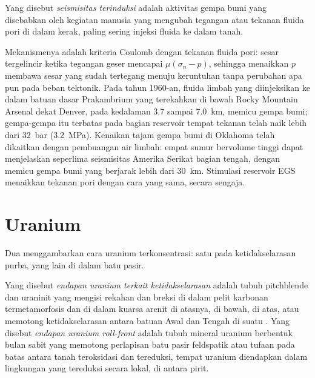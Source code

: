 \begin{definition}\label{def:b2:energy-geology:induced}
Yang disebut \emph{seismisitas terinduksi} adalah aktivitas gempa bumi yang disebabkan oleh kegiatan
manusia yang mengubah tegangan atau tekanan fluida pori di dalam kerak, paling sering
injeksi fluida ke dalam tanah.
\end{definition}

Mekanismenya adalah kriteria Coulomb dengan tekanan fluida pori: sesar tergelincir ketika tegangan geser
mencapai $\mu(\sigma_n - p)$, sehingga menaikkan $p$ membawa sesar yang sudah tertegang menuju keruntuhan
tanpa perubahan apa pun pada beban tektonik. Pada tahun 1960-an, fluida limbah yang diinjeksikan ke dalam batuan dasar
Prakambrium yang terekahkan di bawah Rocky Mountain Arsenal dekat Denver, pada kedalaman 3.7 sampai
\qty{7.0}{km}, memicu gempa bumi; gempa-gempa itu terbatas pada bagian reservoir tempat
tekanan telah naik lebih dari \qty{32}{bar} (\qty{3.2}{MPa}). Kenaikan tajam gempa bumi
di Oklahoma telah dikaitkan dengan pembuangan air limbah: empat sumur bervolume
tinggi dapat menjelaskan seperlima seismisitas Amerika Serikat bagian tengah, dengan memicu
gempa bumi yang berjarak lebih dari \qty{30}{km}. Stimulasi reservoir EGS menaikkan tekanan pori dengan
cara yang sama, secara sengaja.

\section{Uranium}\label{sec:b2:energy-geology:uranium}

Dua  menggambarkan cara uranium terkonsentrasi: satu pada ketidakselarasan purba,
yang lain di dalam batu pasir.

\begin{definition}\label{def:b2:energy-geology:uranium}
Yang disebut \emph{endapan uranium terkait ketidakselarasan} adalah tubuh
pitchblende dan uraninit yang mengisi rekahan dan breksi di dalam pelit karbonan termetamorfosis dan
di dalam kuarsa arenit di atasnya, di bawah, di atas, atau memotong ketidakselarasan antara batuan 
Awal dan Tengah di suatu . Yang disebut \emph{endapan uranium roll-front}
adalah tubuh mineral uranium berbentuk bulan sabit yang memotong perlapisan batu pasir
feldspatik atau tufaan pada batas antara tanah teroksidasi dan tereduksi, tempat
uranium diendapkan dalam lingkungan yang tereduksi secara lokal, di antara pirit.
\end{definition}

